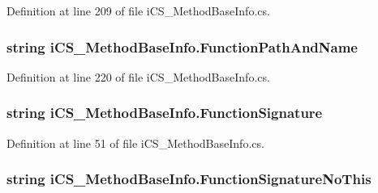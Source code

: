 Definition at line 209 of file i\+C\+S\+\_\+\+Method\+Base\+Info.\+cs.

\hypertarget{classi_c_s___method_base_info_a72d6cf5953f08512f4eab75d798aafea}{
\subsubsection[{Function\+Path\+And\+Name}]{\setlength{\rightskip}{0pt plus 5cm}string i\+C\+S\+\_\+\+Method\+Base\+Info.\+Function\+Path\+And\+Name\hspace{0.3cm}{\ttfamily [get]}}}\label{classi_c_s___method_base_info_a72d6cf5953f08512f4eab75d798aafea}


Definition at line 220 of file i\+C\+S\+\_\+\+Method\+Base\+Info.\+cs.

\hypertarget{classi_c_s___method_base_info_a9dac4594746435786234353626620a0e}{
\subsubsection[{Function\+Signature}]{\setlength{\rightskip}{0pt plus 5cm}string i\+C\+S\+\_\+\+Method\+Base\+Info.\+Function\+Signature\hspace{0.3cm}{\ttfamily [get]}}}\label{classi_c_s___method_base_info_a9dac4594746435786234353626620a0e}


Definition at line 51 of file i\+C\+S\+\_\+\+Method\+Base\+Info.\+cs.

\hypertarget{classi_c_s___method_base_info_ac4ab09e600a55c81d9d4a748123ce2be}{
\subsubsection[{Function\+Signature\+No\+This}]{\setlength{\rightskip}{0pt plus 5cm}string i\+C\+S\+\_\+\+Method\+Base\+Info.\+Function\+Signature\+No\+This\hspace{0.3cm}{\ttfamily [get]}}}\label{classi_c_s___method_base_info_ac4ab09e600a55c81d9d4a748123ce2be}


